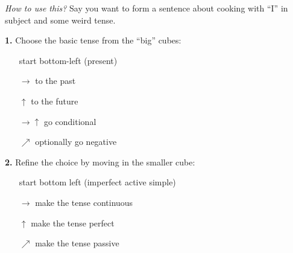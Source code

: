\documentclass{article}
\newcommand{\shiftXB}{12cm}
\newcommand{\shiftYB}{5cm}
\newcommand{\cubewrap}[2]{
\node (WR#1) [draw,rectangle,rounded corners,draw=#2!40,fill=#2!10,fit=(000#1) (100#1) (010#1) (101#1) (111#1)] {};
}
\begin{document}
\begin{center}
\vfill
\parbox{44em}{\emph{How to use this?}
Say you want to form a sentence about cooking with ``I'' in subject and some
weird tense.
\begin{multicols}{2}
{\bfseries 1.} Choose the basic tense from the ``big'' cubes:
\begin{itemize}
\item[start] bottom-left (present)
\item[$\rightarrow$] to the past
\item[$\uparrow$] to the future
\item[$\rightarrow\uparrow$] go conditional
\item[$\nearrow$] optionally go negative
\end{itemize}
\columnbreak
{\bfseries 2.} Refine the choice by moving in the smaller cube:
\begin{itemize}
\item[start] bottom left (imperfect active simple)
\item[$\rightarrow$] make the tense continuous
\item[$\uparrow$] make the tense perfect
\item[$\nearrow$] make the tense passive
\end{itemize}

\end{multicols}
}
\end{center}
\end{document}
